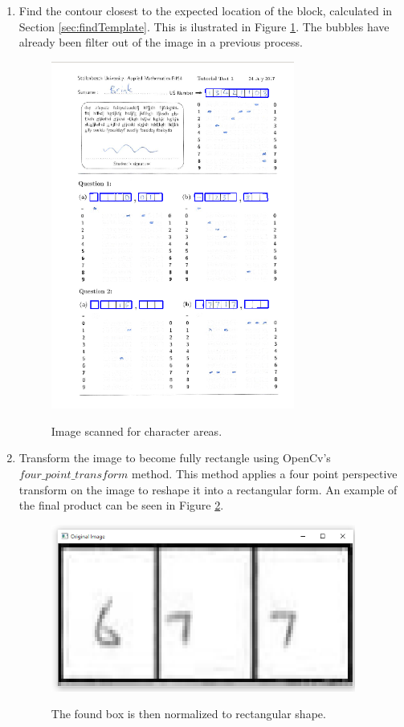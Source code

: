 \begin{enumerate}
\item Find the contour closest to the expected location of the block, calculated in Section \ref{sec:findTemplate}. This is ilustrated in Figure \ref{fig:sa}. The bubbles have already been filter out of the image in a previous process.

\begin{figure}
  \centering
  \includegraphics[width=8cm]{DigitScan}\\
  \caption{Image scanned for character areas.}
  \label{fig:sa}
\end{figure}

\item Transform the image to become fully rectangle using OpenCv's $four\_point\_transform$ method. This method applies a four point perspective transform on the image to reshape it into a rectangular form. An example of the final product can be seen in Figure \ref{fig:bp}.

\begin{figure}
  \centering
  \includegraphics[width=10cm]{BeforeProcessing}\\
  \caption{The found box is then normalized to rectangular shape.}
  \label{fig:bp}
\end{figure}


\end{enumerate}
